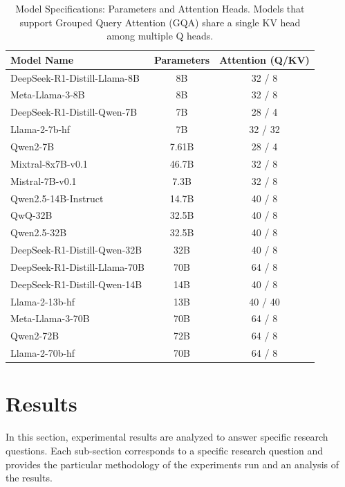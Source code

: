 \documentclass[conference]{IEEEtran}
\begin{document}
\begin{table}[t]
\centering
\begin{tabular}{|l|c|c|}
\hline
\textbf{Model Name} & \textbf{Parameters} & \textbf{Attention (Q/KV)}\\
\hline
DeepSeek-R1-Distill-Llama-8B & 8B & 32 / 8\\
Meta-Llama-3-8B & 8B & 32 / 8  \\
DeepSeek-R1-Distill-Qwen-7B & 7B & 28 / 4 \\
Llama-2-7b-hf & 7B & 32 / 32  \\
Qwen2-7B & 7.61B & 28 / 4  \\
Mixtral-8x7B-v0.1 & 46.7B & 32 / 8  \\
Mistral-7B-v0.1 & 7.3B & 32 / 8  \\
Qwen2.5-14B-Instruct & 14.7B & 40 / 8 \\
QwQ-32B & 32.5B & 40 / 8  \\
Qwen2.5-32B & 32.5B & 40 / 8 \\
DeepSeek-R1-Distill-Qwen-32B & 32B & 40 / 8 \\
DeepSeek-R1-Distill-Llama-70B & 70B & 64 / 8  \\
DeepSeek-R1-Distill-Qwen-14B & 14B & 40 / 8  \\
Llama-2-13b-hf & 13B & 40 / 40 \\
Meta-Llama-3-70B & 70B & 64 / 8  \\
Qwen2-72B & 72B & 64 / 8  \\
Llama-2-70b-hf & 70B & 64 / 8 \\
\hline
\end{tabular}
\caption{Model Specifications: Parameters and Attention Heads. Models that support Grouped Query Attention (GQA) share a single KV head among multiple Q heads.}
\label{tab:model_specs}
\end{table}

\section{Results}
In this section, experimental results are analyzed to answer specific research questions. Each sub-section corresponds to a specific research question and provides the particular methodology of the experiments run and an analysis of the results.
\end{document}
